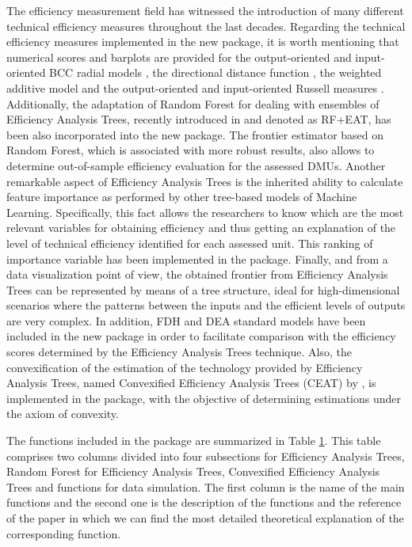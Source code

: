 The efficiency measurement field has witnessed the introduction of many
different technical efficiency measures throughout the last decades.
Regarding the technical efficiency measures implemented in the new
 package, it is worth mentioning that numerical scores and
barplots are provided for the output-oriented and input-oriented BCC
radial models \citep{banker1984}, the directional distance function
\citep{chambers1998}, the weighted additive model
\citetext{\citealp{lovell1995}; \citealp[and][]{cooper1999}} and the
output-oriented and input-oriented Russell measures \citep{fare1978}.
Additionally, the adaptation of Random Forest \citep{breiman2001} for
dealing with ensembles of Efficiency Analysis Trees, recently introduced
in \citet{esteve2021} and denoted as RF+EAT, has been also incorporated
into the new  package. The frontier estimator based on Random
Forest, which is associated with more robust results, also allows to
determine out-of-sample efficiency evaluation for the assessed DMUs.
Another remarkable aspect of Efficiency Analysis Trees is the inherited
ability to calculate feature importance as performed by other tree-based
models of Machine Learning. Specifically, this fact allows the
researchers to know which are the most relevant variables for obtaining
efficiency and thus getting an explanation of the level of technical
efficiency identified for each assessed unit. This ranking of importance
variable has been implemented in the  package. Finally, and
from a data visualization point of view, the obtained frontier from
Efficiency Analysis Trees can be represented by means of a tree
structure, ideal for high-dimensional scenarios where the patterns
between the inputs and the efficient levels of outputs are very complex.
In addition, FDH and DEA standard models have been included in the new
package in order to facilitate comparison with the efficiency scores
determined by the Efficiency Analysis Trees technique. Also, the
convexification of the estimation of the technology provided by
Efficiency Analysis Trees, named Convexified Efficiency Analysis Trees
(CEAT) by \citet{aparicio2021}, is implemented in the  package,
with the objective of determining estimations under the axiom of
convexity.

The functions included in the  package are summarized in Table
\hyperref[Tab:tab1]{1}. This table comprises two columns divided into
four subsections for Efficiency Analysis Trees, Random Forest for
Efficiency Analysis Trees, Convexified Efficiency Analysis Trees and
functions for data simulation. The first column is the name of the main
functions and the second one is the description of the functions and the
reference of the paper in which we can find the most detailed
theoretical explanation of the corresponding function.

